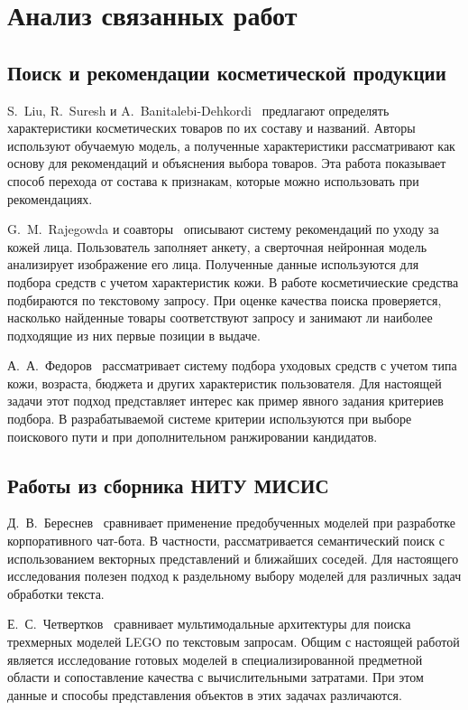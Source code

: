 \documentclass{misisarticle}
\begin{document}
\section{Анализ связанных работ} 

\subsection{Поиск и рекомендации косметической продукции}

S.~Liu, R.~Suresh и A.~Banitalebi-Dehkordi~\cite{liu2024} предлагают определять характеристики косметических товаров по их составу и названий. Авторы используют обучаемую модель, а полученные характеристики рассматривают как основу для рекомендаций и объяснения выбора товаров. Эта работа показывает способ перехода от состава к признакам, которые можно использовать при рекомендациях.

G.~M.~Rajegowda и соавторы~\cite{rajegowda2024} описывают систему рекомендаций по уходу за кожей лица. Пользователь заполняет анкету, а сверточная нейронная модель анализирует изображение его лица. Полученные данные используются для подбора средств с учетом характеристик кожи. В работе косметичиеские средства подбираются по текстовому запросу. При оценке качества поиска проверяется, насколько найденные товары соответствуют запросу и занимают ли наиболее подходящие из них первые позиции в выдаче. 

А.~А.~Федоров~\cite{fedorov2025} рассматривает систему подбора уходовых средств с учетом типа кожи, возраста, бюджета и других характеристик пользователя. Для настоящей задачи этот подход представляет интерес как пример явного задания критериев подбора. В разрабатываемой системе критерии используются при выборе поискового пути и при дополнительном ранжировании кандидатов.

\subsection{Работы из сборника НИТУ МИСИС}

Д.~В.~Береснев~\cite{beresnev2023} сравнивает применение предобученных моделей при разработке корпоративного чат-бота. В частности, рассматривается семантический поиск с использованием векторных представлений и ближайших соседей. Для настоящего исследования полезен подход к раздельному выбору моделей для различных задач обработки текста.

Е.~С.~Четвертков~\cite{chetvertkov2026} сравнивает мультимодальные архитектуры для поиска трехмерных моделей LEGO по текстовым запросам. Общим с настоящей работой является исследование готовых моделей в специализированной предметной области и сопоставление качества с вычислительными затратами. При этом данные и способы представления объектов в этих задачах различаются.
\end{document}
